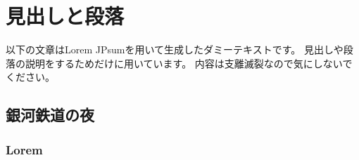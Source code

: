 \chapter{見出しと段落}

以下の文章はLorem JPsum\cite{LoremJPs26:online}を用いて生成したダミーテキストです。
見出しや段落の説明をするためだけに用いています。
内容は支離滅裂なので気にしないでください。

\begin{comment}
    \textblockcolour{pink}
    \begin{textblock}{4}(16, 1)
        \noindent
        【5】目次に続いて本文
    \end{textblock}

    \textblockcolour{PowderBlue}
    \begin{textblock}{12}(6, 6)
    \noindent
    以降、1章 (chapter)、1.1節 (section)、1.1.1項 (subsection) と呼ぶ
    \end{textblock}

    \begin{textblock}{6}(8, 12)
    1章の最初の節が1.1

    1.1節の最初の項が1.1.1
    \end{textblock}


    \begin{textblock}{2}(0.5, 13.5)
    \noindent
    段落1行目を字下げをする
    \end{textblock}

    \begin{textblock}{2}(0.5, 18)
    \noindent
    内容の区切りに合わせて段落を分ける
    \end{textblock}

    \begin{textblock}{6}(11, 26.5)
        本文の開始ページを1とする
    \end{textblock}
\end{comment}


\section{銀河鉄道の夜}

\subsection{Lorem}

